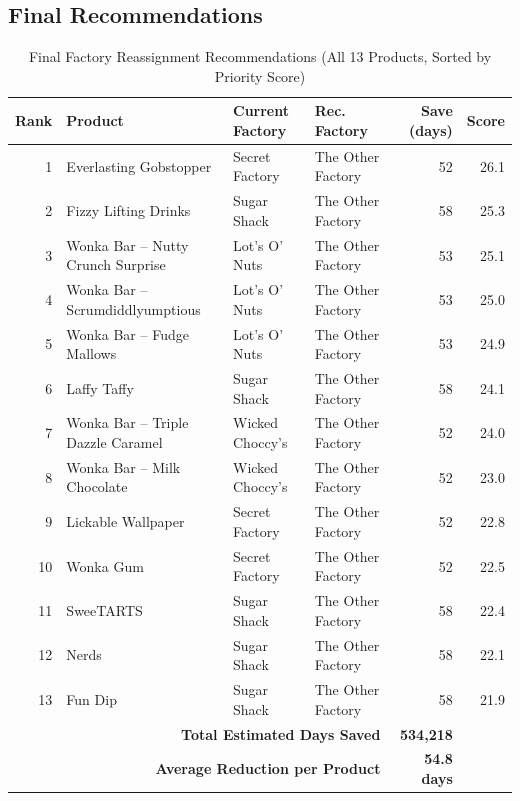 \documentclass[12pt, a4paper]{article}
\begin{document}
\subsection{Final Recommendations}

\begin{table}[H]
\centering
\caption{Final Factory Reassignment Recommendations
         (All 13 Products, Sorted by Priority Score)}
\label{tab:final_recommendations}
\renewcommand{\arraystretch}{1.15}
\small
\begin{tabularx}{\textwidth}{rp{4.5cm}p{2.8cm}p{2.8cm}rr}
\toprule
\textbf{Rank} & \textbf{Product} & \textbf{Current Factory}
    & \textbf{Rec. Factory}
    & \textbf{Save (days)} & \textbf{Score} \\
\midrule
1  & Everlasting Gobstopper            & Secret Factory
    & The Other Factory & 52 & 26.1 \\
2  & Fizzy Lifting Drinks              & Sugar Shack
    & The Other Factory & 58 & 25.3 \\
3  & Wonka Bar -- Nutty Crunch Surprise & Lot's O' Nuts
    & The Other Factory & 53 & 25.1 \\
4  & Wonka Bar -- Scrumdiddlyumptious  & Lot's O' Nuts
    & The Other Factory & 53 & 25.0 \\
5  & Wonka Bar -- Fudge Mallows        & Lot's O' Nuts
    & The Other Factory & 53 & 24.9 \\
6  & Laffy Taffy                       & Sugar Shack
    & The Other Factory & 58 & 24.1 \\
7  & Wonka Bar -- Triple Dazzle Caramel & Wicked Choccy's
    & The Other Factory & 52 & 24.0 \\
8  & Wonka Bar -- Milk Chocolate       & Wicked Choccy's
    & The Other Factory & 52 & 23.0 \\
9  & Lickable Wallpaper                & Secret Factory
    & The Other Factory & 52 & 22.8 \\
10 & Wonka Gum                         & Secret Factory
    & The Other Factory & 52 & 22.5 \\
11 & SweeTARTS                         & Sugar Shack
    & The Other Factory & 58 & 22.4 \\
12 & Nerds                             & Sugar Shack
    & The Other Factory & 58 & 22.1 \\
13 & Fun Dip                           & Sugar Shack
    & The Other Factory & 58 & 21.9 \\
\midrule
\multicolumn{4}{r}{\textbf{Total Estimated Days Saved}}
    & \textbf{534,218} & \\
\multicolumn{4}{r}{\textbf{Average Reduction per Product}}
    & \textbf{54.8 days} & \\
\bottomrule
\end{tabularx}
\end{table}
\end{document}
